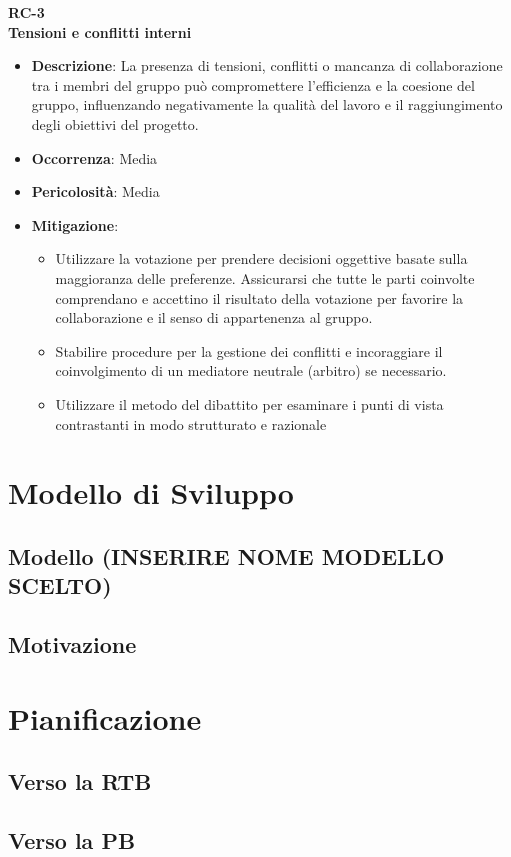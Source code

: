 \documentclass[5pt]{article}
\begin{document}
\textbf{RC-3}\\
\textbf{Tensioni e conflitti interni}
\begin{itemize}
  \item \textbf{Descrizione}: La presenza di tensioni, conflitti o mancanza di collaborazione tra i membri del gruppo può compromettere l'efficienza e la coesione del gruppo, influenzando negativamente la qualità del lavoro e il raggiungimento degli obiettivi del progetto.
  \item \textbf{Occorrenza}: Media
  \item \textbf{Pericolosità}: Media
  \item \textbf{Mitigazione}: 
    \begin{itemize}
      \item Utilizzare la votazione per prendere decisioni oggettive basate sulla maggioranza delle preferenze. Assicurarsi che tutte le parti coinvolte comprendano e accettino il risultato della votazione per favorire la collaborazione e il senso di appartenenza al gruppo.
      \item Stabilire procedure per la gestione dei conflitti e incoraggiare il coinvolgimento di un mediatore neutrale (arbitro) se necessario.
      \item Utilizzare il metodo del dibattito per esaminare i punti di vista contrastanti in modo strutturato e razionale
    \end{itemize}
\end{itemize}

\section{Modello di Sviluppo}
\subsection{Modello (INSERIRE NOME MODELLO SCELTO)}
\subsection{Motivazione}

\section{Pianificazione}
\subsection{Verso la RTB}
\subsection{Verso la PB}
\end{document}
